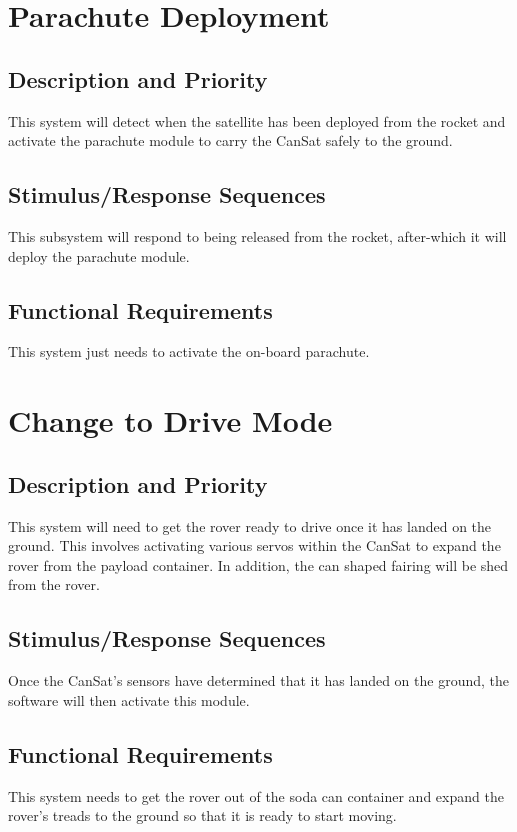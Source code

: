 \documentclass{scrreprt}
\begin{document}
\section{Parachute Deployment}


\subsection{Description and Priority}
This system will detect when the satellite has been deployed from the rocket and activate the parachute module to carry the CanSat safely to the ground.


\subsection{Stimulus/Response Sequences}
This  subsystem will respond to being released from the rocket, after-which it will deploy the parachute module.

\subsection{Functional Requirements}
This system just needs to activate the on-board parachute.


\section{Change to Drive Mode}

\subsection{Description and Priority}
This system will need to get the rover ready to drive once it has landed on the ground. This involves activating various servos within the CanSat to expand the rover from the payload container. In addition, the can shaped fairing will be shed from the rover. 


\subsection{Stimulus/Response Sequences}
Once the CanSat's sensors have determined that it has landed on the ground, the software will then activate this module.

\subsection{Functional Requirements}
This system needs to get the rover out of the soda can container and expand the rover's treads to the ground so that it is ready to start moving.
\end{document}
